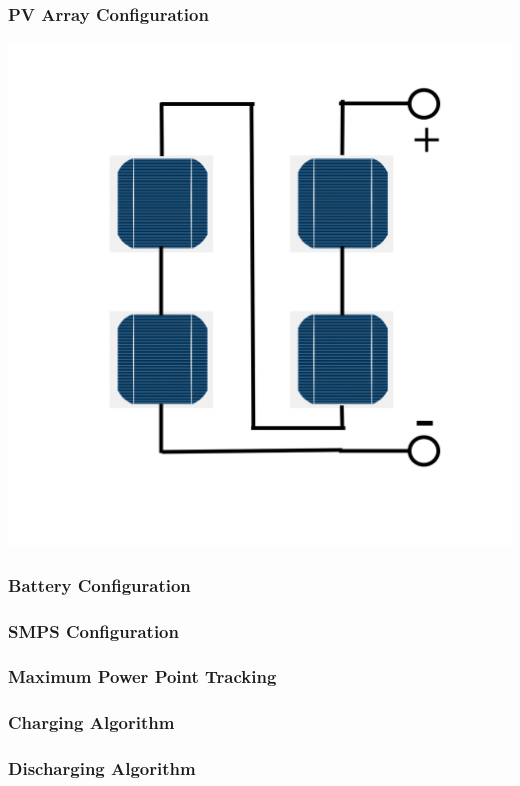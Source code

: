 \documentclass[a4paper]{article}
\begin{document}
\subsubsection{PV Array Configuration}
    \includegraphics[scale=0.3]{Series(S)}
\subsubsection{Battery Configuration}

\subsubsection{SMPS Configuration}

\subsubsection{Maximum Power Point Tracking}

\subsubsection{Charging Algorithm}

\subsubsection{Discharging Algorithm}
\end{document}
